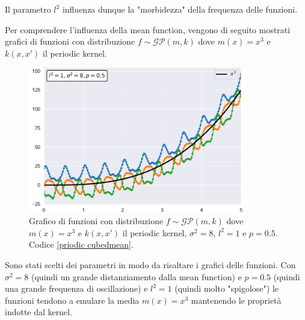 Il parametro $l^2$ influenza dunque la "morbidezza" della frequenza delle funzioni.


\newpage 
Per comprendere l'influenza della mean function, vengono di seguito mostrati grafici di funzioni con distribuzione $f\sim \mathcal{GP}(m,k)$ dove $m(x)=x^3$ e $k(x,x')$ il periodic kernel.
\begin{figure}[h]
    \centering
    \includegraphics[width=0.85\textwidth]{images/Gaussian process/Periodic - cubedmean.pdf}
    \caption{Grafico di funzioni con distribuzione  $f\sim \mathcal{GP}(m,k)$ dove $m(x)=x^3$ e $k(x,x')$ il periodic kernel, $\sigma^2=8$, $l^2=1$ e $p=0.5$. Codice \ref{priodic cubedmean}.}
    \label{3 sample periodic kernel cubed mean}
\end{figure}

Sono stati scelti dei parametri in modo da risaltare i grafici delle funzioni. Con $\sigma^2=8$ (quindi un grande distanziamento dalla mean function) e $p=0.5$ (quindi una grande frequenza di oscillazione) e $l^2=1$ (quindi molto "spigolose") le funzioni tendono a emulare la media $m(x)=x^3$ mantenendo le proprietà indotte dal kernel.

\newpage



